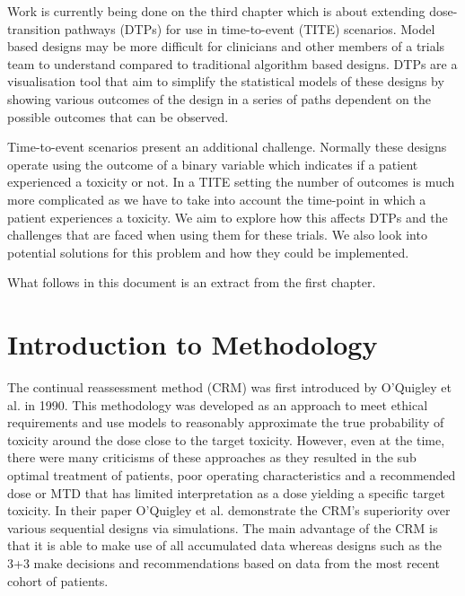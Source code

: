Work is currently being done on the third chapter which is about extending dose-transition pathways (DTPs) for use in time-to-event (TITE) scenarios. Model based designs may be more difficult for clinicians and other members of a trials team to understand compared to traditional algorithm based designs. DTPs are a visualisation tool that aim to simplify the statistical models of these designs by showing various outcomes of the design in a series of paths dependent on the possible outcomes that can be observed. 

Time-to-event scenarios present an additional challenge. Normally these designs operate using the outcome of a binary variable which indicates if a patient experienced a toxicity or not. In a TITE setting the number of outcomes is much more complicated as we have to take into account the time-point in which a patient experiences a toxicity. We aim to explore how this affects DTPs and the challenges that are faced when using them for these trials. We also look into potential solutions for this problem and how they could be implemented. 

What follows in this document is an extract from the first chapter. 

\section{Introduction to Methodology}

The continual reassessment method (CRM) was first introduced by O'Quigley et al. \cite{oquigleyContinualReassessmentMethod1990} in 1990. This methodology was developed as an approach to meet ethical requirements and use models to reasonably approximate the true probability of toxicity around the dose close to the target toxicity. However, even at the time, there were many criticisms of these approaches as they resulted in the sub optimal treatment of patients, poor operating characteristics and a recommended dose or MTD that has limited interpretation as a dose yielding a specific target toxicity. In their paper O'Quigley et al. \cite{oquigleyContinualReassessmentMethod1990} demonstrate the CRM's superiority over various sequential designs via simulations. The main advantage of the CRM is that it is able to make use of all accumulated data whereas designs such as the 3+3 make decisions and recommendations based on data from the most recent cohort of patients.

